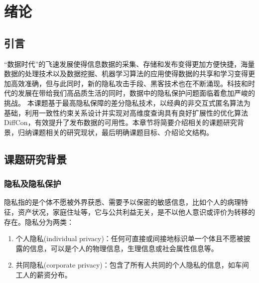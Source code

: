 
\chapter{绪论}
\label{chap:introduction}

\section{引言}
\label{sec:objective}
“数据时代”的飞速发展使得信息数据的采集、存储和发布变得更加方便快捷，海量数据的处理技术以及数据挖掘、机器学习算法的应用使得数据的共享和学习变得更加高效准确，但与此同时，新的隐私攻击手段、黑客技术也在不断涌现。科技和时代的发展在带给我们高品质生活的同时，数据中的隐私保护问题面临着愈加严峻的挑战。
本课题基于最高隐私保障的差分隐私技术，以经典的非交互式匿名算法为基础，利用一致性约束关系设计并实现对高维度查询具有良好扩展性的优化算法DiffCon，有效提升了发布数据的可用性。本章节将简要介绍相关的课题研究背景，归纳课题相关的研究现状，最后明确课题目标、介绍论文结构。


\section{课题研究背景}

\subsection{隐私及隐私保护}  %

隐私指的是个体不愿被外界获悉、需要予以保密的敏感信息，比如个人的病理特征，资产状况，家庭住址等，它与公共利益无关，是不以他人意识或评价为转移的存在。隐私分为两类\supercite{Defining-Privacy-for-Data}：
\begin{enumerate}
	\item 个人隐私(individual privacy)：任何可直接或间接地标识单一个体且不愿被披露的信息，可以是个人的物理信息，生理信息或社会属性信息等。
	\item 共同隐私(corporate privacy)：包含了所有人共同的个人隐私的信息，如车间工人的薪资分布。
\end{enumerate}

